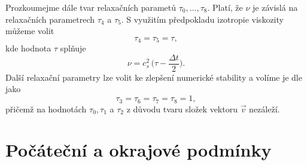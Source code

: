 Prozkoumejme dále tvar relaxačních parametů $ \tau_{0}, \dots, \tau_{8}$. Platí, že $ \nu $ je závislá na relaxačních parametrech $ \tau_{4} $ a $ \tau_{5} $. S využitím předpokladu izotropie viskozity \cite{DP-PE} můžeme volit
\begin{equation}
\tau_{4} = \tau_{5} = \tau,
\end{equation}
kde hodnota $ \tau $ splňuje
\begin{equation}\label{eq:tauclbm}
\nu = c^{2}_{s} \, \Bigg( \tau  - \frac{\Delta t}{2} \Bigg).
\end{equation}
Další relaxační parametry lze volit ke zlepšení numerické stability a volíme je dle \cite{GeierCLBM} jako
\begin{equation}
\tau_{3} = \tau_{6} = \tau_{7} = \tau_{8} = 1,
\end{equation}
přičemž na hodnotách $ \tau_{0}, \tau_{1} $ a $ \tau_{2} $ z důvodu tvaru složek vektoru $\vec{v}$ nezáleží.

\section{Počáteční a okrajové podmínky}\label{pocatecni a okrajove podminky}


